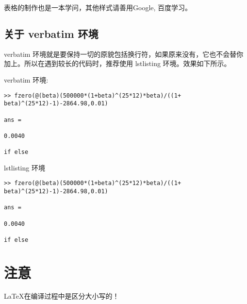 表格的制作也是一本学问，其他样式请善用Google, 百度学习。

\subsection{关于 verbatim 环境}
verbatim 环境就是要保持一切的原貌包括换行符，如果原来没有，它也不会替你加上。所以在遇到较长的代码时，推荐使用 lstlisting 环境。效果如下所示。

verbatim 环境:
\begin{verbatim}
>> fzero(@(beta)(500000*(1+beta)^(25*12)*beta)/((1+ beta)^(25*12)-1)-2864.98,0.01)

ans =

0.0040

if else
\end{verbatim}

lstlisting 环境
\begin{lstlisting}
>> fzero(@(beta)(500000*(1+beta)^(25*12)*beta)/((1+ beta)^(25*12)-1)-2864.98,0.01)

ans =

0.0040

if else
\end{lstlisting}
\section{注意}
\LaTeX 在编译过程中是区分大小写的！



